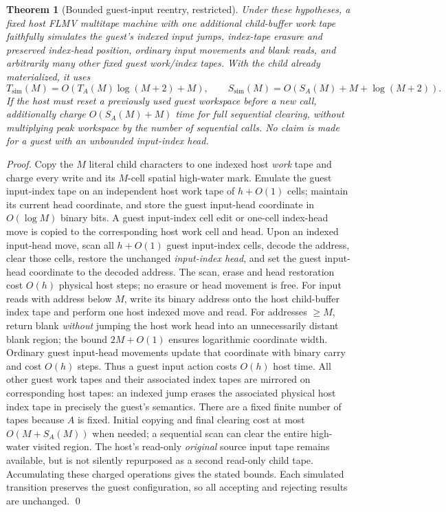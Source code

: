 \documentclass[11pt]{article}
\newtheorem{theorem}{Theorem}
\begin{document}
\begin{theorem}[Bounded guest-input reentry, restricted]
Under these hypotheses, a fixed host FLMV multitape machine with one additional child-buffer work tape faithfully simulates the guest's indexed input jumps, index-tape erasure and preserved index-head position, ordinary input movements and blank reads, and arbitrarily many other fixed guest work/index tapes. With the child already materialized, it uses
\[
T_{\mathrm{sim}}(M)=O\!\left(T_A(M)\log(M+2)+M\right),\qquad
S_{\mathrm{sim}}(M)=O\!\left(S_A(M)+M+\log(M+2)\right).
\]
If the host must reset a previously used guest workspace before a new call, additionally charge $O(S_A(M)+M)$ time for full sequential clearing, without multiplying peak workspace by the number of \emph{sequential} calls. No claim is made for a guest with an unbounded input-index head.
\end{theorem}
\begin{proof}
Copy the $M$ literal child characters to one indexed host \emph{work} tape and charge every write and its $M$-cell spatial high-water mark. Emulate the guest input-index tape on an independent host work tape of $h+O(1)$ cells; maintain its current head coordinate, and store the guest input-head coordinate in $O(\log M)$ binary bits. A guest input-index cell edit or one-cell index-head move is copied to the corresponding host work cell and head. Upon an indexed input-head move, scan all $h+O(1)$ guest input-index cells, decode the address, clear those cells, restore the unchanged \emph{input-index head}, and set the guest input-head coordinate to the decoded address. The scan, erase and head restoration cost $O(h)$ physical host steps; no erasure or head movement is free. For input reads with address below $M$, write its binary address onto the host child-buffer index tape and perform one host indexed move and read. For addresses $\ge M$, return blank \emph{without} jumping the host work head into an unnecessarily distant blank region; the bound $2M+O(1)$ ensures logarithmic coordinate width. Ordinary guest input-head movements update that coordinate with binary carry and cost $O(h)$ steps. Thus a guest input action costs $O(h)$ host time. All other guest work tapes and their associated index tapes are mirrored on corresponding host tapes: an indexed jump erases the associated physical host index tape in precisely the guest's semantics. There are a fixed finite number of tapes because $A$ is fixed. Initial copying and final clearing cost at most $O(M+S_A(M))$ when needed; a sequential scan can clear the entire high-water visited region. The host's read-only \emph{original} source input tape remains available, but is not silently repurposed as a second read-only child tape. Accumulating these charged operations gives the stated bounds. Each simulated transition preserves the guest configuration, so all accepting and rejecting results are unchanged. \qed
\end{proof}
\end{document}
